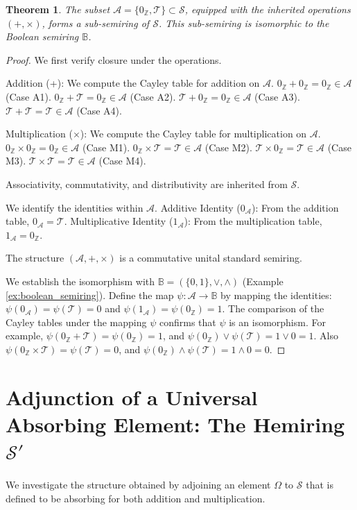 \documentclass[11pt, a4paper]{article}
\theoremstyle{plain}
\newtheorem{theorem}{Theorem}[section]
\theoremstyle{definition}
\numberwithin{equation}{section}
\newcommand{\Z}{\mathbb{Z}}
\newcommand{\Tobj}{\mathcal{T}} %
\newcommand{\OmegaObj}{\Omega} %
\newcommand{\SemiringS}{\mathcal{S}}
\newcommand{\SemiringSPrime}{\mathcal{S}'}
\newcommand{\Bool}{\mathbb{B}} %
\newcommand{\SetA}{\mathcal{A}}
\begin{document}
\begin{theorem}\label{thm:structure_A_is_Boolean}
The subset $\SetA = \{0_{\Z}, \Tobj\} \subset \SemiringS$, equipped with the inherited operations $(+, \times)$, forms a sub-semiring of $\SemiringS$. This sub-semiring is isomorphic to the Boolean semiring $\Bool$.
\end{theorem}
\begin{proof}
We first verify closure under the operations.

Addition (+): We compute the Cayley table for addition on $\SetA$.
$0_{\Z}+0_{\Z}=0_{\Z} \in \SetA$ (Case A1).
$0_{\Z}+\Tobj=0_{\Z} \in \SetA$ (Case A2).
$\Tobj+0_{\Z}=0_{\Z} \in \SetA$ (Case A3).
$\Tobj+\Tobj=\Tobj \in \SetA$ (Case A4).

Multiplication ($\times$): We compute the Cayley table for multiplication on $\SetA$.
$0_{\Z}\times 0_{\Z}=0_{\Z} \in \SetA$ (Case M1).
$0_{\Z}\times\Tobj=\Tobj \in \SetA$ (Case M2).
$\Tobj\times 0_{\Z}=\Tobj \in \SetA$ (Case M3).
$\Tobj\times\Tobj=\Tobj \in \SetA$ (Case M4).

Associativity, commutativity, and distributivity are inherited from $\SemiringS$.

We identify the identities within $\SetA$.
Additive Identity ($0_{\SetA}$): From the addition table, $0_{\SetA}=\Tobj$.
Multiplicative Identity ($1_{\SetA}$): From the multiplication table, $1_{\SetA}=0_{\Z}$.

The structure $(\SetA, +, \times)$ is a commutative unital standard semiring.

We establish the isomorphism with $\Bool=(\{0, 1\}, \lor, \wedge)$ (Example \ref{ex:boolean_semiring}).
Define the map $\psi: \SetA \to \Bool$ by mapping the identities: $\psi(0_{\SetA})=\psi(\Tobj)=0$ and $\psi(1_{\SetA})=\psi(0_{\Z})=1$.
The comparison of the Cayley tables under the mapping $\psi$ confirms that $\psi$ is an isomorphism. For example, $\psi(0_{\Z}+\Tobj) = \psi(0_{\Z})=1$, and $\psi(0_{\Z})\lor\psi(\Tobj) = 1\lor 0 = 1$. Also $\psi(0_{\Z}\times\Tobj) = \psi(\Tobj)=0$, and $\psi(0_{\Z})\wedge\psi(\Tobj) = 1\wedge 0 = 0$.
\end{proof}

\section{Adjunction of a Universal Absorbing Element: The Hemiring $\SemiringSPrime$}

We investigate the structure obtained by adjoining an element $\OmegaObj$ to $\SemiringS$ that is defined to be absorbing for both addition and multiplication.
\end{document}
